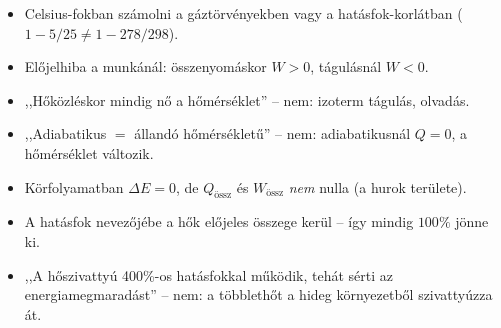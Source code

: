 \documentclass[11pt,a4paper]{article}
\begin{document}
\begin{figyelem}
\begin{itemize}
  \item Celsius-fokban számolni a gáztörvényekben vagy a hatásfok-korlátban
    ($1 - 5/25 \neq 1 - 278/298$).
  \item Előjelhiba a munkánál: összenyomáskor $W > 0$, tágulásnál $W < 0$.
  \item ,,Hőközléskor mindig nő a hőmérséklet'' -- nem: izoterm tágulás, olvadás.
  \item ,,Adiabatikus $=$ állandó hőmérsékletű'' -- nem: adiabatikusnál $Q = 0$, a
    hőmérséklet változik.
  \item Körfolyamatban $\Delta E = 0$, de $Q_\text{össz}$ és $W_\text{össz}$ \emph{nem} nulla
    (a hurok területe).
  \item A hatásfok nevezőjébe a hők előjeles összege kerül -- így mindig $100\%$ jönne ki.
  \item ,,A hőszivattyú 400\%-os hatásfokkal működik, tehát sérti az energiamegmaradást''
    -- nem: a többlethőt a hideg környezetből szivattyúzza át.
\end{itemize}
\end{figyelem}
\end{document}
